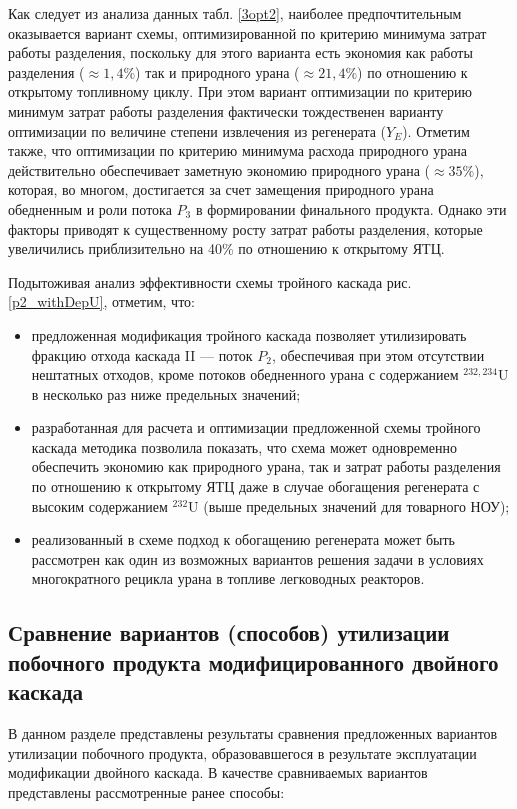 Как следует из анализа данных табл. \ref{3opt2}, наиболее предпочтительным оказывается вариант схемы, оптимизированной по критерию минимума затрат работы разделения, поскольку для этого варианта есть экономия как работы разделения ($\approx 1,4\%$) так и природного урана ($\approx 21,4\%$) по отношению к открытому топливному циклу. При этом вариант оптимизации по критерию минимум затрат работы разделения фактически тождественен варианту оптимизации по величине степени извлечения из регенерата ($Y_E$). Отметим также, что оптимизации по критерию минимума расхода природного урана действительно обеспечивает заметную экономию природного урана ($\approx 35\%$), которая, во многом, достигается за счет замещения природного урана обедненным и роли потока $P_3$ в формировании финального продукта. Однако эти факторы приводят к существенному росту затрат работы разделения, которые увеличились приблизительно на 40\% по отношению к открытому ЯТЦ.

Подытоживая анализ эффективности схемы тройного каскада рис. \ref{p2_withDepU}, отметим, что:

\begin{itemize}
    \item предложенная модификация тройного каскада позволяет утилизировать фракцию отхода каскада II --- поток $P_2$, обеспечивая при этом отсутствии нештатных отходов, кроме потоков обедненного урана с содержанием $^{232,234}$U в несколько раз ниже предельных значений; 
    \item разработанная для расчета и оптимизации предложенной схемы тройного каскада методика позволила показать, что схема может одновременно обеспечить экономию как природного урана, так и затрат работы разделения по отношению к открытому ЯТЦ даже в случае обогащения регенерата с высоким содержанием $^{232}$U (выше предельных значений для товарного НОУ); 
    \item реализованный в схеме подход к обогащению регенерата может быть рассмотрен как один из возможных вариантов решения задачи в условиях многократного рецикла урана в топливе легководных реакторов.
\end{itemize}

\subsection{Сравнение вариантов (способов) утилизации побочного продукта модифицированного двойного каскада}

В данном разделе представлены результаты сравнения предложенных вариантов утилизации побочного продукта, образовавшегося в результате эксплуатации модификации двойного каскада. В качестве сравниваемых вариантов представлены рассмотренные ранее способы: 

